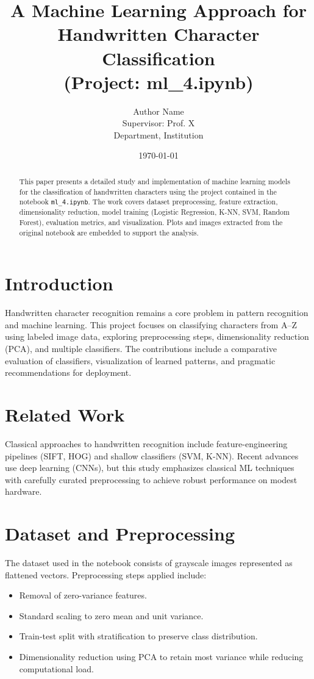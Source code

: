 \documentclass[12pt,a4paper]{article}
\title{A Machine Learning Approach for Handwritten Character Classification \\ (Project: ml_4.ipynb)}
\author{Author Name \\ Supervisor: Prof. X \\ Department, Institution}
\date{\today}
\begin{document}
\maketitle
\begin{abstract}
This paper presents a detailed study and implementation of machine learning models for the classification of handwritten characters using the project contained in the notebook \texttt{ml\_4.ipynb}. The work covers dataset preprocessing, feature extraction, dimensionality reduction, model training (Logistic Regression, K-NN, SVM, Random Forest), evaluation metrics, and visualization. Plots and images extracted from the original notebook are embedded to support the analysis.
\end{abstract}

\section{Introduction}
Handwritten character recognition remains a core problem in pattern recognition and machine learning. This project focuses on classifying characters from A--Z using labeled image data, exploring preprocessing steps, dimensionality reduction (PCA), and multiple classifiers. The contributions include a comparative evaluation of classifiers, visualization of learned patterns, and pragmatic recommendations for deployment.

\section{Related Work}
Classical approaches to handwritten recognition include feature-engineering pipelines (SIFT, HOG) and shallow classifiers (SVM, K-NN). Recent advances use deep learning (CNNs), but this study emphasizes classical ML techniques with carefully curated preprocessing to achieve robust performance on modest hardware.

\section{Dataset and Preprocessing}
The dataset used in the notebook consists of grayscale images represented as flattened vectors. Preprocessing steps applied include:
\begin{itemize}
  \item Removal of zero-variance features.
  \item Standard scaling to zero mean and unit variance.
  \item Train-test split with stratification to preserve class distribution.
  \item Dimensionality reduction using PCA to retain most variance while reducing computational load.
\end{itemize}
\end{document}
